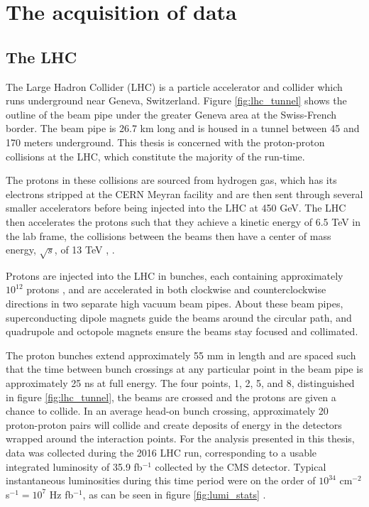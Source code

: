 \chapter{The acquisition of data}

\section{The LHC}
  The Large Hadron Collider (LHC) is a particle accelerator and collider which runs underground near Geneva, Switzerland. Figure \ref{fig:lhc_tunnel} shows the outline of the beam pipe under the greater Geneva area at the Swiss-French border. The beam pipe is 26.7 km long and is housed in a tunnel between 45 and 170 meters underground. This thesis is concerned with the proton-proton collisions at the LHC, which constitute the majority of the run-time. 

  The protons in these collisions are sourced from hydrogen gas, which has its electrons stripped at the CERN Meyran facility and are then sent through several smaller accelerators before being injected into the LHC at 450 GeV. The LHC then accelerates the protons such that they achieve a kinetic energy of 6.5 TeV in the lab frame, the collisions between the beams then have a center of mass energy, $\sqrt{s}$, of 13 TeV \cite{LHC_JINST}, \cite{LHC_TDR}. 

  Protons are injected into the LHC in bunches, each containing approximately $10^{12}$ protons \cite{Lumi_unc}, and are accelerated in both clockwise and counterclockwise directions in two separate high vacuum beam pipes. About these beam pipes, superconducting dipole magnets guide the beams around the circular path, and quadrupole and octopole magnets ensure the beams stay focused and collimated.

  The proton bunches extend approximately 55 mm in length and are spaced such that the time between bunch crossings at any particular point in the beam pipe is approximately 25 ns at full energy. The four points, 1, 2, 5, and 8, distinguished in figure \ref{fig:lhc_tunnel}, the beams are crossed and the protons are given a chance to collide. In an average head-on bunch crossing, approximately 20 proton-proton pairs will collide and create deposits of energy in the detectors wrapped around the interaction points. For the analysis presented in this thesis, data was collected during the 2016 LHC run, corresponding to a usable integrated luminosity of 35.9 fb$^{-1}$ collected by the CMS detector. Typical instantaneous luminosities during this time period were on the order of $10^{34}$ cm$^{-2}$ s$^{-1} = 10^7$ Hz fb$^{-1}$, as can be seen in figure \ref{fig:lumi_stats} \cite{lumi_twiki}.

